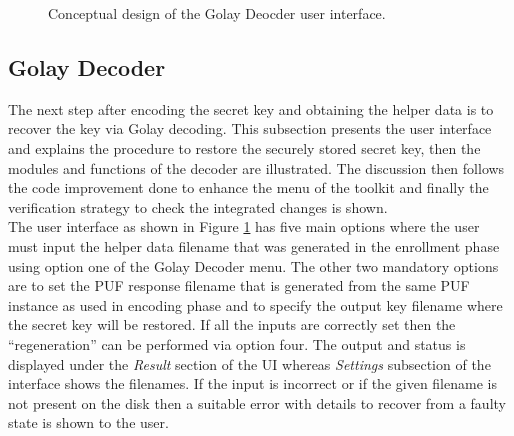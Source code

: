 	\begin{figure}[h]
	\centering
	\caption{Conceptual design of the Golay Deocder user interface.}
	\label{img:golay_decoder_ui}
	\end{figure}
	\subsection{Golay Decoder}
	The next step after encoding the secret key and obtaining the helper data is to recover the key via Golay decoding. This subsection presents the user interface and explains the procedure to restore the securely stored secret key, then the modules and functions of the decoder are illustrated. The discussion then follows the code improvement done to enhance the menu of the toolkit and finally the verification strategy to check the integrated changes is shown.\\

	The user interface as shown in Figure \ref{img:golay_decoder_ui} has five main options where the user must input the helper data filename that was generated in the enrollment phase using option one of the Golay Decoder menu. The other two mandatory options are to set the PUF response filename that is generated from the same PUF instance as used in encoding phase and to specify the output key filename where the secret key will be restored. If all the inputs are correctly set then the ``regeneration'' can be performed via option four. The output and status is displayed
	under the \emph{Result} section of the UI whereas \emph{Settings} subsection of the interface shows the filenames. If the input is incorrect or if the given filename is not present on the disk then a suitable error with details to recover from a faulty state is shown to the user.\\

